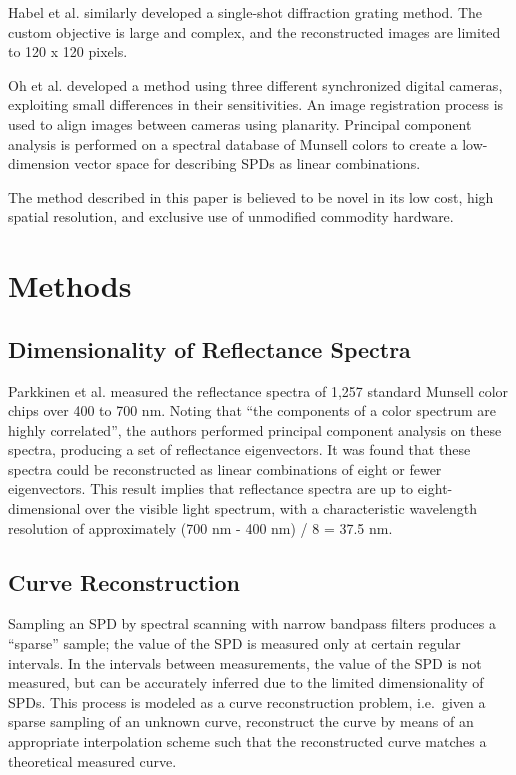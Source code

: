 \documentclass[twocolumn,10pt]{asme2ej}
\newcommand{\id}{\hspace{6 mm}}
\begin{document}
\id Habel et al. \cite{Habel} similarly developed a single-shot diffraction grating method. The custom objective is large and complex, and the reconstructed images are limited to 120 x 120 pixels.

\id Oh et al. \cite{Oh} developed a method using three different synchronized digital cameras, exploiting small differences in their sensitivities. An image registration process is used to align images between cameras using planarity. Principal component analysis is performed on a spectral database of Munsell colors to create a low-dimension vector space for describing SPDs as linear combinations.

\id The method described in this paper is believed to be novel in its low cost, high spatial resolution, and exclusive use of unmodified commodity hardware.

\section{Methods}

\subsection{Dimensionality of Reflectance Spectra}

Parkkinen et al. \cite{Parkkinen} measured the reflectance spectra of 1,257 standard Munsell color chips over 400 to 700 nm. Noting that ``the components of a color spectrum are highly correlated'', the authors performed principal component analysis on these spectra, producing a set of reflectance eigenvectors. It was found that these spectra could be reconstructed as linear combinations of eight or fewer eigenvectors. This result implies that reflectance spectra are up to eight-dimensional over the visible light spectrum, with a characteristic wavelength resolution of approximately (700 nm - 400 nm) / 8 = 37.5 nm.

\subsection{Curve Reconstruction}
\label{curve_reconstruction}

Sampling an SPD by spectral scanning with narrow bandpass filters produces a ``sparse'' sample; the value of the SPD is measured only at certain regular intervals. In the intervals between measurements, the value of the SPD is not measured, but can be accurately inferred due to the limited dimensionality of SPDs. This process is modeled as a curve reconstruction problem, i.e.\ given a sparse sampling of an unknown curve, reconstruct the curve by means of an appropriate interpolation scheme such that the reconstructed curve matches a theoretical measured curve.
\end{document}

